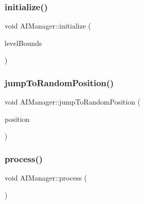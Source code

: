 \hypertarget{class_a_i_manager_a9ac554c9d74432fe3ef74fedab936847}{}\label{class_a_i_manager_a9ac554c9d74432fe3ef74fedab936847} 
\subsubsection{\texorpdfstring{initialize()}{initialize()}}
{\footnotesize\ttfamily void A\+I\+Manager\+::initialize (\begin{DoxyParamCaption}\item[{sf\+::\+Float\+Rect}]{level\+Bounds }\end{DoxyParamCaption})\hspace{0.3cm}{\ttfamily [static]}}

\hypertarget{class_a_i_manager_a96ee060f8e8d6f01280c2eff2d66ea6a}{}\label{class_a_i_manager_a96ee060f8e8d6f01280c2eff2d66ea6a} 
\subsubsection{\texorpdfstring{jump\+To\+Random\+Position()}{jumpToRandomPosition()}}
{\footnotesize\ttfamily void A\+I\+Manager\+::jump\+To\+Random\+Position (\begin{DoxyParamCaption}\item[{\hyperlink{class_vector2_d}{Vector2D} \&}]{position }\end{DoxyParamCaption})\hspace{0.3cm}{\ttfamily [static]}}

\hypertarget{class_a_i_manager_aaa175d0e5d024f0965e3acd2e53f4fbd}{}\label{class_a_i_manager_aaa175d0e5d024f0965e3acd2e53f4fbd} 
\subsubsection{\texorpdfstring{process()}{process()}}
{\footnotesize\ttfamily void A\+I\+Manager\+::process (\begin{DoxyParamCaption}{ }\end{DoxyParamCaption})\hspace{0.3cm}{\ttfamily [static]}}

\hypertarget{class_a_i_manager_a254b2cb95e86b6056c7625782f846a83}{}\label{class_a_i_manager_a254b2cb95e86b6056c7625782f846a83} 

